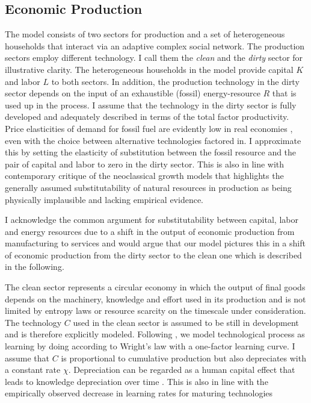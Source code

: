\subsection{Economic Production}
\label{sec:model_description}

The model consists of two sectors for production and a set of heterogeneous households that interact via an adaptive complex social network. The production sectors employ different technology. I call them the \textit{clean} and the \textit{dirty} sector for illustrative clarity. The heterogeneous households in the model provide capital $K$ and labor $L$ to both sectors.
In addition, the production technology in the dirty sector depends on the input of an exhaustible (fossil) energy-resource $R$ that is used up in the process. I assume that the technology in the dirty sector is fully developed and adequately described in terms of the total factor productivity. 
Price elasticities of demand for fossil fuel are evidently low in real economies \cite{IMF2011, Hosslinger2017, Labandeira2017}, even with the choice between alternative technologies factored in. I approximate this by setting the elasticity of substitution between the fossil resource and the pair of capital and labor to zero in the dirty sector. This is also in line with contemporary critique of the neoclassical growth models \cite{Daly1997,georgescu1975energy,georgescu1979comments, Ayres2007, Ayres2013} that highlights the generally assumed substitutability of natural resources in production as being physically implausible and lacking empirical evidence.

I acknowledge the common argument for substitutability between capital, labor and energy resources due to a shift in the output of economic production from manufacturing to services and would argue that our model pictures this in a shift of economic production from the dirty sector to the clean one which is described in the following.

The clean sector represents a circular economy in which the output of final goods depends on the machinery, knowledge and effort used in its production and is not limited by entropy laws or resource scarcity on the timescale under consideration. The technology $C$ used in the clean sector is assumed to be still in development and is therefore explicitly modeled.
Following \cite{argote1990learning}, we model technological process as learning by doing according to Wright's law \cite{wright1936factors, Nagy2013} with a one-factor learning curve. I assume that $C$ is proportional to cumulative production but also depreciates with a constant rate $\chi$. Depreciation can be regarded as a human capital effect that leads to knowledge depreciation over time \cite{Kahouli-Brahmi2008}. This is also in line with the empirically observed decrease in learning rates for maturing technologies \cite{argote1990learning}

